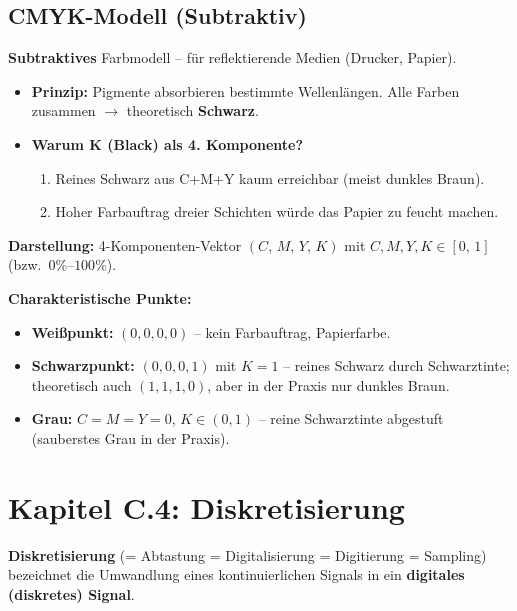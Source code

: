 \documentclass[12pt, a4paper]{article}
\begin{document}
\subsection{CMYK-Modell (Subtraktiv)}

\textbf{Subtraktives} Farbmodell -- für reflektierende Medien (Drucker, Papier).

\begin{itemize}
  \item \textbf{Prinzip:} Pigmente absorbieren bestimmte Wellenlängen. Alle
        Farben zusammen $\rightarrow$ theoretisch \textbf{Schwarz}.
  \item \textbf{Warum K (Black) als 4. Komponente?}
    \begin{enumerate}
      \item Reines Schwarz aus C+M+Y kaum erreichbar (meist dunkles Braun).
      \item Hoher Farbauftrag dreier Schichten würde das Papier zu feucht machen.
    \end{enumerate}
\end{itemize}

\textbf{Darstellung:} 4-Komponenten-Vektor $(C,\,M,\,Y,\,K)$ mit
$C,M,Y,K \in [0,\,1]$ (bzw.\ $0\%$--$100\%$).

\textbf{Charakteristische Punkte:}
\begin{itemize}
  \item \textbf{Weißpunkt:} $(0,0,0,0)$ -- kein Farbauftrag, Papierfarbe.
  \item \textbf{Schwarzpunkt:} $(0,0,0,1)$ mit $K=1$ -- reines Schwarz durch
        Schwarztinte; theoretisch auch $(1,1,1,0)$, aber in der Praxis nur
        dunkles Braun.
  \item \textbf{Grau:} $C=M=Y=0$, $K \in (0,1)$ -- reine Schwarztinte
        abgestuft (sauberstes Grau in der Praxis).
\end{itemize}


\section{Kapitel C.4: Diskretisierung}

\textbf{Diskretisierung} (= Abtastung = Digitalisierung = Digitierung =
Sampling) bezeichnet die Umwandlung eines kontinuierlichen Signals in ein
\textbf{digitales (diskretes) Signal}.
\end{document}
